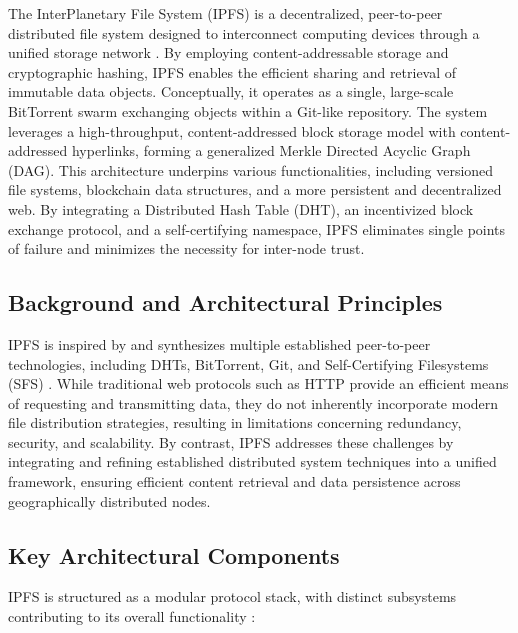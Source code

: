 \documentclass[final]{rc-book-2.14}
\begin{document}
The InterPlanetary File System (IPFS) is a decentralized, peer-to-peer distributed file system designed to interconnect computing devices through a unified storage network \cite{benet2014ipfs}. By employing content-addressable storage and cryptographic hashing, IPFS enables the efficient sharing and retrieval of immutable data objects. Conceptually, it operates as a single, large-scale BitTorrent swarm exchanging objects within a Git-like repository. The system leverages a high-throughput, content-addressed block storage model with content-addressed hyperlinks, forming a generalized Merkle Directed Acyclic Graph (DAG). This architecture underpins various functionalities, including versioned file systems, blockchain data structures, and a more persistent and decentralized web. By integrating a Distributed Hash Table (DHT), an incentivized block exchange protocol, and a self-certifying namespace, IPFS eliminates single points of failure and minimizes the necessity for inter-node trust.

\subsection{Background and Architectural Principles}

IPFS is inspired by and synthesizes multiple established peer-to-peer technologies, including DHTs, BitTorrent, Git, and Self-Certifying Filesystems (SFS) \cite{benet2014ipfs}. While traditional web protocols such as HTTP provide an efficient means of requesting and transmitting data, they do not inherently incorporate modern file distribution strategies, resulting in limitations concerning redundancy, security, and scalability. By contrast, IPFS addresses these challenges by integrating and refining established distributed system techniques into a unified framework, ensuring efficient content retrieval and data persistence across geographically distributed nodes.

\subsection{Key Architectural Components}

IPFS is structured as a modular protocol stack, with distinct subsystems contributing to its overall functionality \cite{benet2014ipfs}:
\end{document}
